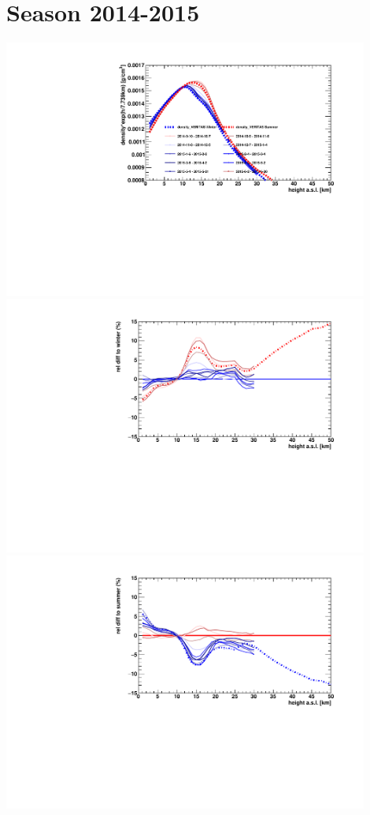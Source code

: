 \section*{Season 2014-2015}
\noindent\begin{minipage}{\textwidth}
\centering
\includegraphics[width=0.9\textwidth]{season-2014-2015-density.pdf}
\includegraphics[width=0.9\textwidth]{season-relativeWinter-2014-2015-density.pdf}
\includegraphics[width=0.9\textwidth]{season-relativeSummer-2014-2015-density.pdf}
\end{minipage}
